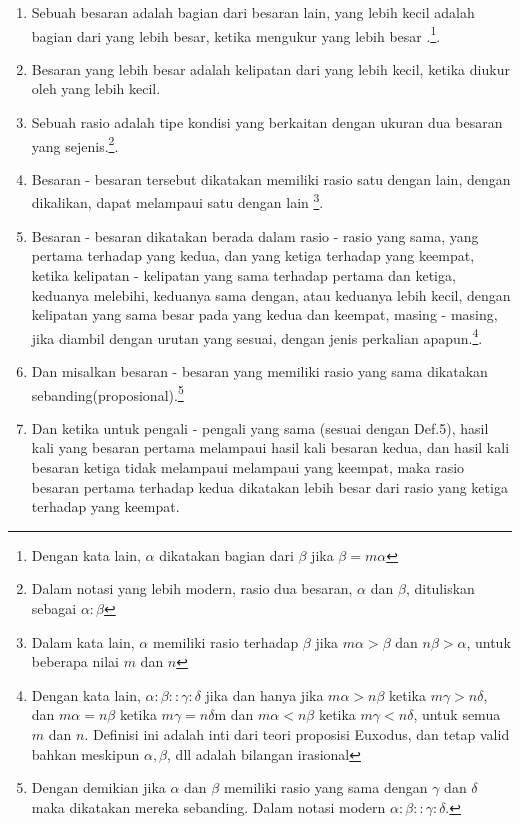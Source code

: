 \documentclass[a4paper]{book}
\begin{document}
\begin{enumerate}
\item Sebuah besaran adalah bagian dari besaran lain, yang lebih kecil 
adalah bagian dari yang lebih besar, ketika mengukur yang lebih besar
.\footnote{Dengan kata lain, 
$\alpha$ dikatakan bagian dari $\beta$ jika $\beta = m\alpha$}.
\item Besaran yang lebih besar adalah kelipatan dari yang lebih kecil, 
ketika diukur oleh yang lebih kecil.
\item Sebuah rasio adalah tipe kondisi yang berkaitan dengan ukuran
dua besaran yang sejenis.\footnote{Dalam notasi yang lebih modern, rasio dua besaran, $\alpha$ dan $\beta$, dituliskan sebagai $\alpha : \beta$}.
\item Besaran - besaran tersebut dikatakan memiliki rasio satu dengan 
lain, dengan dikalikan, dapat melampaui satu dengan lain 
\footnote{Dalam kata lain, $\alpha$ memiliki rasio terhadap $\beta$ jika
$m \alpha>\beta$ dan $n \beta > \alpha$, untuk beberapa nilai $m$ 
dan $n$}.
\item Besaran - besaran dikatakan berada dalam rasio - rasio yang sama,
yang pertama terhadap yang kedua, dan yang ketiga terhadap yang keempat,
ketika kelipatan - kelipatan yang sama terhadap pertama dan ketiga, 
keduanya melebihi, keduanya sama dengan, atau keduanya lebih kecil, 
dengan kelipatan yang sama besar pada yang kedua dan keempat, 
masing - masing, jika diambil dengan urutan yang sesuai, dengan jenis 
perkalian apapun.\footnote{Dengan kata lain, $\alpha : \beta :: \gamma :
\delta$ jika dan hanya jika $m\alpha>n\beta$ ketika $m\gamma > n\delta$,
dan $m\alpha = n\beta$ ketika $m\gamma = n\delta$m dan 
$m\alpha < n\beta$ ketika $m\gamma < n\delta$, untuk semua $m$ dan $n$. 
Definisi ini adalah inti dari teori proposisi Euxodus, dan tetap valid 
bahkan meskipun $\alpha, \beta$, dll adalah bilangan irasional}.
\item Dan misalkan besaran - besaran yang memiliki rasio yang sama
dikatakan sebanding(proposional).\footnote{Dengan demikian jika $\alpha$ dan $\beta$
memiliki rasio yang sama dengan $\gamma$ dan $\delta$ maka dikatakan 
mereka sebanding. Dalam notasi modern $\alpha:\beta::\gamma:\delta$.}
\item Dan ketika untuk pengali - pengali yang sama (sesuai dengan Def.5),
hasil kali yang besaran pertama melampaui hasil kali besaran kedua, 
dan hasil kali besaran ketiga tidak melampaui melampaui yang keempat, 
maka rasio besaran pertama terhadap kedua  dikatakan lebih besar dari
rasio yang ketiga terhadap yang keempat.

\end{enumerate}
\end{document}
